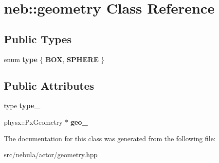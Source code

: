 \hypertarget{classneb_1_1geometry}{
\section{neb::geometry Class Reference}
\label{classneb_1_1geometry}
}
\subsection*{Public Types}
\begin{DoxyCompactItemize}
\item 
enum {\bfseries type} \{ {\bfseries BOX}, 
{\bfseries SPHERE}
 \}
\end{DoxyCompactItemize}
\subsection*{Public Attributes}
\begin{DoxyCompactItemize}
\item 
\hypertarget{classneb_1_1geometry_a5747e38891f27136cd45a23ea986b595}{
type {\bfseries type\_\-}}
\label{classneb_1_1geometry_a5747e38891f27136cd45a23ea986b595}

\item 
\hypertarget{classneb_1_1geometry_a2e7f1ef07f66b904852c1ae9e84f9f55}{
physx::PxGeometry $\ast$ {\bfseries geo\_\-}}
\label{classneb_1_1geometry_a2e7f1ef07f66b904852c1ae9e84f9f55}

\end{DoxyCompactItemize}


The documentation for this class was generated from the following file:\begin{DoxyCompactItemize}
\item 
src/nebula/actor/geometry.hpp\end{DoxyCompactItemize}
